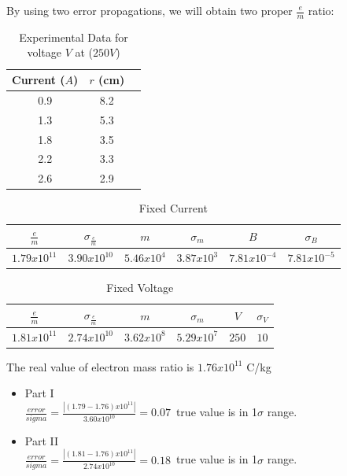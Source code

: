 \documentclass[aps,nofootinbib,onecolumn,groupedaddress,a4paper]{revtex4}
\begin{document}
By using two error propagations, we will obtain two proper $\frac{e}{m}$ ratio:

\begin{table}[htdp]
\caption{ Experimental Data for voltage $V$ at ($250V$)}
\label{rawdata}
\centering
\begin{tabular}{ccc}
\\
Current ($A$)  & $r$ (cm)  \\
\hline
0.9 &  8.2   \\
1.3 &  5.3   \\
1.8 &  3.5   \\
2.2 &  3.3   \\
2.6 &  2.9   
\end{tabular}
\label{default}
\end{table}%

\begin{table}[htdp]
\caption{Fixed Current }
\label{rawdata}
\centering
\begin{tabular}{cccccc}
\\
$\frac{e}{m}$   & $\sigma_{\frac{e}{m}}$ & $m$ & $\sigma_{m}$ & $B$ & $\sigma_{B}$  \\
\hline
$1.79x{10}^{11}$  & $3.90x{10}^{10}$ & $5.46x{10}^{4}$ & $3.87x{10}^{3}$ & $7.81x{10}^{-4}$ & $7.81x{10}^{-5}$
  
\end{tabular}
\label{default}
\end{table}%

\begin{table}[htdp]
\caption{Fixed Voltage }
\label{rawdata}
\centering
\begin{tabular}{cccccc}
\\
$\frac{e}{m}$   & $\sigma_{\frac{e}{m}}$ & $m$ & $\sigma_{m}$ & $V$ & $\sigma_{V}$  \\
\hline
$1.81x{10}^{11}$  & $2.74x{10}^{10}$ & $3.62x{10}^{8}$ & $5.29x{10}^{7}$ & $250$ & $10$
  
\end{tabular}
\label{default}
\end{table}%





The real value of electron mass ratio is $1.76 x {10}^{11}$ C/kg\\

\begin{itemize}
\item Part I\\
$\frac{error}{sigma}=\frac{|(1.79-1.76) x {10}^{11}|}{3.60 x {10}^{10}}= 0.07 $\, true value is in 1$\sigma$ range.

\item Part II\\

$\frac{error}{sigma}=\frac{|(1.81-1.76) x {10}^{11}|}{2.74 x {10}^{10}}= 0.18 $\, true value is in 1$\sigma$ range.




\end{itemize} 
\end{document}
